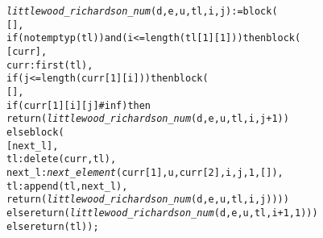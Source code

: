 \begin{alltt}
\emph{littlewood\_richardson\_num} (d, e, u, tl, i, j) := block (
  [],
  if (not emptyp (tl)) and (i <= length (tl[1][1]))then block (
    [curr],
    curr : first (tl),
    if (j <= length (curr[1][i])) then block (
      [],
      if (curr[1][i][j] # inf) then
         return (\emph{littlewood\_richardson\_num} (d, e, u, tl, i, j+1))
      else block (
        [next\_l],
        tl : delete (curr, tl),
        next\_l : \emph{next\_element} (curr[1], u, curr[2], i, j, 1, []),
        tl : append (tl, next\_l),
        return (\emph{littlewood\_richardson\_num} (d, e, u, tl, i, j))))
    else return (\emph{littlewood\_richardson\_num} (d, e, u, tl, i+1, 1)))
  else return (tl));
\end{alltt}
